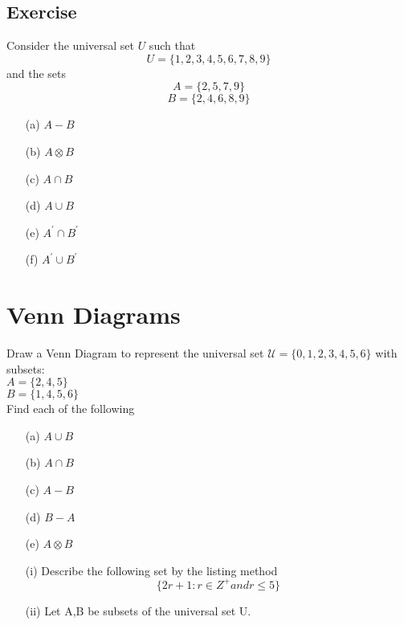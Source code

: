 \subsection*{Exercise}
Consider the universal set $U$ such that
\[U=\{1,2,3,4,5,6,7,8,9\} \] 
and the sets
\[A=\{2,5,7,9\} \] 
\[B=\{2,4,6,8,9\} \]

\begin{multicols}{2}
\begin{itemize}
\item[(a)] $A-B$
\item[(b)] $A \otimes B$
\item[(c)] $A \cap B$
\item[(d)] $A \cup B$
\item[(e)] $A^{\prime} \cap B^{\prime}$
\item[(f)] $A^{\prime} \cup B^{\prime}$
\end{itemize}
\end{multicols}

\newpage

\section*{Venn Diagrams}

Draw a Venn Diagram to represent the universal set
$\mathcal{U} = \{0,1,2,3,4,5,6\}$ with subsets:\\
$A = \{2,4,5\}$\\
$B = \{1,4,5,6\}$\\

\noindent Find each of the following
\begin{itemize}
\item[(a)] $A \cup B $
\item[(b)] $A \cap B $
\item[(c)] $A-B$
\item[(d)] $B-A$
\item[(e)] $A \otimes B$
\end{itemize}
\newpage



\begin{itemize}
\item[(i)] Describe the following set by the listing method
\[ \{ 2r+1 : r \in Z^{+} and r \leq 5  \} \]
\item[(ii)] Let A,B be subsets of the universal set U.


\end{itemize}

